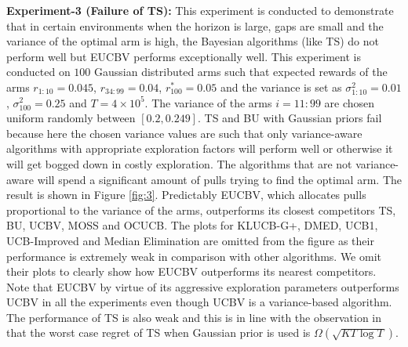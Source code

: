 
\textbf{Experiment-3 (Failure of TS):} This experiment is conducted to demonstrate that in certain environments when the horizon is large, gaps are small and the variance of the optimal arm is high, the Bayesian algorithms (like TS) do not perform well but EUCBV performs exceptionally well. This experiment is conducted on $100$ Gaussian distributed arms such that expected rewards of the arms $r_{1:10}=0.045$, $r_{34:99}=0.04$, $r^{*}_{100}=0.05$ and the variance is set as $\sigma_{1:10}^{2}=0.01$,   $\sigma_{100}^{2}=0.25$ and $T=4\times 10^5$. The variance of the arms $i=11:99$ are chosen uniform randomly between $[0.2,0.249]$. TS and BU with Gaussian priors fail because here the chosen variance values are such that only variance-aware algorithms with appropriate exploration factors will perform  well or otherwise it will get bogged down in costly exploration. The algorithms that are not variance-aware will spend a significant amount of pulls trying to find the optimal arm. The result is shown in Figure \ref{fig:3}. Predictably EUCBV, which allocates pulls proportional to the variance of the arms, outperforms its closest competitors TS, BU, UCBV, MOSS and OCUCB. The plots for KLUCB-G+, DMED, UCB1, UCB-Improved and Median Elimination are omitted from the figure as their performance is extremely weak in comparison with other algorithms. We omit their plots to clearly show how EUCBV outperforms its nearest competitors. Note that EUCBV by virtue of its aggressive exploration parameters outperforms UCBV in all the experiments even though UCBV is a variance-based algorithm. The performance of TS is also weak and this is in line with the observation in  \cite{lattimore2015optimally} that the worst case regret of TS when Gaussian prior is used is $\Omega\left( \sqrt{KT\log T}\right)$.



